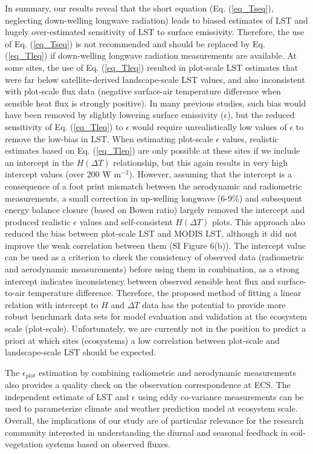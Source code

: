 \documentclass[fleqn,10pt]{wlscirep}
\begin{document}
In summary, our results reveal that the short equation (Eq. (\ref{eq_Tseq}), neglecting down-welling longwave radiation) leads to biased estimates of LST and hugely over-estimated sensitivity of LST to surface emissivity. Therefore, the use of Eq. (\ref{eq_Tseq}) is not recommended and should be replaced by Eq. (\ref{eq_Tleq}) if down-welling longwave radiation measurements are available. At some sites, the use of Eq. (\ref{eq_Tleq}) resulted in plot-scale LST estimates that were far below satellite-derived landscape-scale LST values, and also inconsistent with plot-scale flux data (negative surface-air temperature difference when sensible heat flux is strongly positive). In many previous studies, such bias would have been removed by slightly lowering surface emissivity ($\epsilon$), but the reduced sensitivity of Eq. (\ref{eq_Tleq}) to $\epsilon$ would require unrealistically low values of $\epsilon$ to remove the low-bias in LST. When estimating plot-scale $\epsilon$ values, realistic estimates based on Eq. (\ref{eq_Tleq}) are only possible at these sites if we include an intercept in the $H (\Delta T)$ relationship, but this again results in very high intercept values (over 200 W m$^{-2}$). However, assuming that the intercept is a consequence of a foot print mismatch between the aerodynamic and radiometric measurements, a small correction in up-welling longwave (6-9\%) and subsequent energy balance closure (based on Bowen ratio) largely removed the intercept and produced realistic $\epsilon$ values and self-consistent $H(\Delta T)$ plots. This approach also reduced the bias between plot-scale LST and MODIS LST, although it did not improve the weak correlation between them (SI Figure 6(b)). The intercept value can be used as a criterion to check the consistency of observed data (radiometric and aerodynamic measurements) before using them in combination, as a strong intercept indicates inconsistency between observed sensible heat flux and surface-to-air temperature difference. Therefore, the proposed method of fitting a linear relation with intercept to $H$ and $\Delta T$ data has the potential to provide more robust benchmark data sets for model evaluation and validation at the ecosystem scale (plot-scale). Unfortunately, we are currently not in the position to predict a priori at which sites (ecosystems) a low correlation between plot-scale and landscape-scale LST should be expected.

The $\epsilon_{plot}$ estimation by combining radiometric and aerodynamic measurements also provides a quality check on the observation correspondence at ECS. The independent estimate of LST and $\epsilon$ using eddy co-variance measurements can be used to parameterize climate and weather prediction model at ecosystem scale. Overall, the implications of our study are of particular relevance for the research community interested in understanding the diurnal and seasonal feedback in soil-vegetation systems based on observed fluxes. 
 
\end{document}
